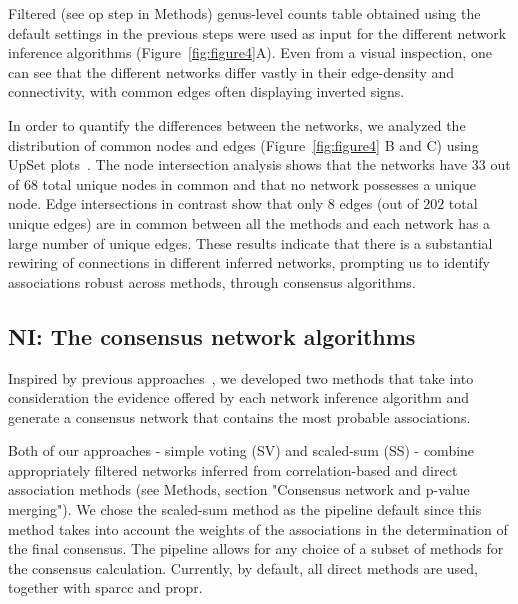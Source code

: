   Filtered (see \ac{op} step in Methods) genus-level counts table obtained using the default settings in the previous steps were used as input for the different network inference algorithms (Figure~\ref{fig:figure4}A).
  Even from a visual inspection, one can see that the different networks differ vastly in their edge-density and connectivity, with common edges often displaying inverted signs.

  In order to quantify the differences between the networks, we analyzed the distribution of common nodes and edges (Figure~\ref{fig:figure4} B and C) using UpSet plots~\cite{Lex}.
  The node intersection analysis shows that the networks have $33$ out of $68$ total unique nodes in common and that no network possesses a unique node.
  Edge intersections in contrast show that only $8$ edges (out of $202$ total unique edges) are in common between all the methods and each network has a large number of unique edges.
  These results indicate that there is a substantial rewiring of connections in different inferred networks, prompting us to identify associations robust across methods, through consensus algorithms.

  \FloatBarrier

  \subsection*{NI: The consensus network algorithms}

 Inspired by previous approaches~\cite{bustinceFuzzySetsTheir2008,tsarevApplicationMajorityVoting2018}, we developed two methods that take into consideration the evidence offered by each network inference algorithm and generate a consensus network that contains the most probable associations.

  Both of our approaches - simple voting (SV) and scaled-sum (SS) - combine appropriately filtered networks inferred from correlation-based and direct association methods (see Methods, section "Consensus network and p-value merging").
  We chose the scaled-sum method as the pipeline default since this method takes into account the weights of the associations in the determination of the final consensus.
  The pipeline allows for any choice of a subset of methods for the consensus calculation. Currently, by default, all direct methods are used, together with \acs{sparcc} and propr.

